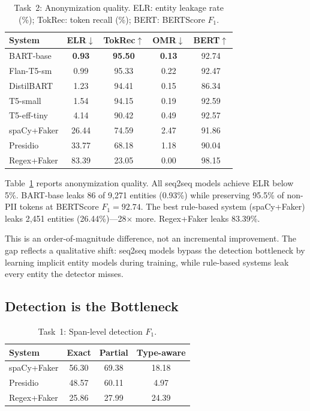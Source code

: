 \documentclass[10pt,twocolumn]{article}
\begin{document}
\begin{table}[t]
\centering
\caption{Task~2: Anonymization quality. ELR: entity leakage rate (\%); TokRec: token recall (\%); BERT: BERTScore $F_1$.}\label{tab:anon}
\small
\begin{tabular}{@{}lcccc@{}}
\toprule
System & ELR$\downarrow$ & TokRec$\uparrow$ & OMR$\downarrow$ & BERT$\uparrow$ \\
\midrule
BART-base & \textbf{0.93} & \textbf{95.50} & \textbf{0.13} & 92.74 \\
Flan-T5-sm & 0.99 & 95.33 & 0.22 & 92.47 \\
DistilBART & 1.23 & 94.41 & 0.15 & 86.34 \\
T5-small & 1.54 & 94.15 & 0.19 & 92.59 \\
T5-eff-tiny & 4.14 & 90.42 & 0.49 & 92.57 \\
\midrule
spaCy+Faker & 26.44 & 74.59 & 2.47 & 91.86 \\
Presidio & 33.77 & 68.18 & 1.18 & 90.04 \\
Regex+Faker & 83.39 & 23.05 & 0.00 & 98.15 \\
\bottomrule
\end{tabular}
\end{table}

Table~\ref{tab:anon} reports anonymization quality.
All seq2seq models achieve ELR below 5\%.
BART-base leaks 86 of 9{,}271 entities (0.93\%) while preserving 95.5\% of non-PII tokens at BERTScore $F_1 = 92.74$.
The best rule-based system (spaCy+Faker) leaks 2{,}451 entities (26.44\%)---28$\times$ more.
Regex+Faker leaks 83.39\%.

This is an order-of-magnitude difference, not an incremental improvement.
The gap reflects a qualitative shift: seq2seq models bypass the detection bottleneck by learning implicit entity models during training, while rule-based systems leak every entity the detector misses.

\subsection{Detection is the Bottleneck}\label{sec:res-det}

\begin{table}[t]
\centering
\caption{Task~1: Span-level detection $F_1$.}\label{tab:detection}
\small
\begin{tabular}{@{}lccc@{}}
\toprule
System & Exact & Partial & Type-aware \\
\midrule
spaCy+Faker & 56.30 & 69.38 & 18.18 \\
Presidio & 48.57 & 60.11 & 4.97 \\
Regex+Faker & 25.86 & 27.99 & 24.39 \\
\bottomrule
\end{tabular}
\end{table}
\end{document}
